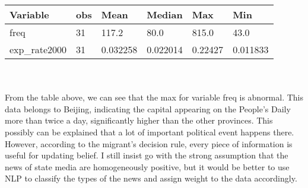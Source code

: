 \documentclass{article}
\begin{document}
\begin{table}[H]
\centering
\captionsetup{labelfont=bf}
\label{tab:title}
\begin{tabular}{llllll}
  \hline
  Variable  & obs & Mean & Median  & Max & Min \\ 
  \hline
  freq & 31 & 117.2 & 80.0 & 815.0 & 43.0 \\ 
  exp\_rate2000 & 31 & 0.032258&  0.022014 & 0.22427 & 0.011833 \\ 
   \hline
\end{tabular}
\end{table}\\~\\
From the table above, we can see that the max for variable freq is abnormal. This data belongs to Beijing, indicating the capital appearing on the People's Daily more than twice a day, significantly higher than the other provinces. This possibly can be explained that a lot of important political event happens there. However, according to the migrant's decision rule, every piece of information is useful for updating belief. I still insist go with the strong assumption that the news of state media are homogeneously positive, but it would be better to use NLP to classify the types of the news and assign weight to the data accordingly.
\end{document}
